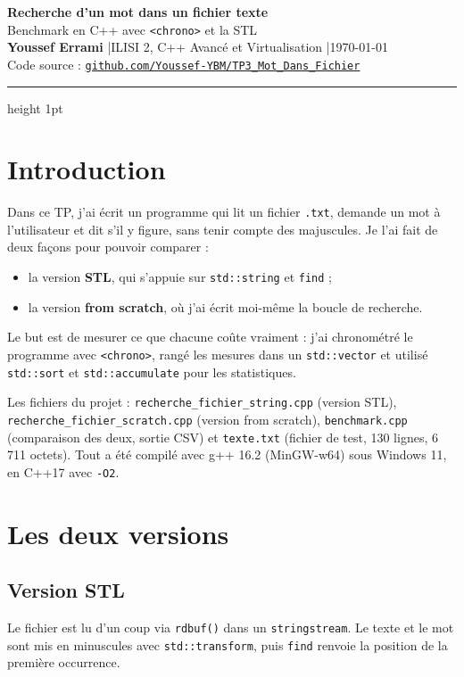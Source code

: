 \documentclass[11pt,a4paper]{article}
\begin{document}
\noindent
{\LARGE\bfseries\color{bleu} Recherche d'un mot dans un fichier texte}\\[0.3em]
{\large Benchmark en C++ avec \texttt{<chrono>} et la STL}\\[0.6em]
\textbf{Youssef Errami} \quad|\quad ILISI 2, C++ Avancé et Virtualisation \quad|\quad \today\\
Code source : \href{https://github.com/Youssef-YBM/TP3_Mot_Dans_Fichier}{\texttt{github.com/Youssef-YBM/TP3\_Mot\_Dans\_Fichier}}
\par\medskip
{\color{bleu}\hrule height 1pt}

\section{Introduction}

Dans ce TP, j'ai écrit un programme qui lit un fichier \texttt{.txt}, demande un mot
à l'utilisateur et dit s'il y figure, sans tenir compte des majuscules.
Je l'ai fait de deux façons pour pouvoir comparer :
\begin{itemize}
  \item la version \textbf{STL}, qui s'appuie sur \texttt{std::string} et \texttt{find} ;
  \item la version \textbf{from scratch}, où j'ai écrit moi-même la boucle de recherche.
\end{itemize}
Le but est de mesurer ce que chacune coûte vraiment : j'ai chronométré
le programme avec \texttt{<chrono>}, rangé les mesures dans un \texttt{std::vector}
et utilisé \texttt{std::sort} et \texttt{std::accumulate} pour les statistiques.

Les fichiers du projet :
\texttt{recherche\_fichier\_string.cpp} (version STL),
\texttt{recherche\_fichier\_scratch.cpp} (version from scratch),
\texttt{benchmark.cpp} (comparaison des deux, sortie CSV) et
\texttt{texte.txt} (fichier de test, 130 lignes, 6\,711 octets).
Tout a été compilé avec g++ 16.2 (MinGW-w64) sous Windows 11, en C++17 avec \texttt{-O2}.

\section{Les deux versions}

\subsection{Version STL}
Le fichier est lu d'un coup via \texttt{rdbuf()} dans un \texttt{stringstream}.
Le texte et le mot sont mis en minuscules avec \texttt{std::transform}, puis
\texttt{find} renvoie la position de la première occurrence.
\end{document}
